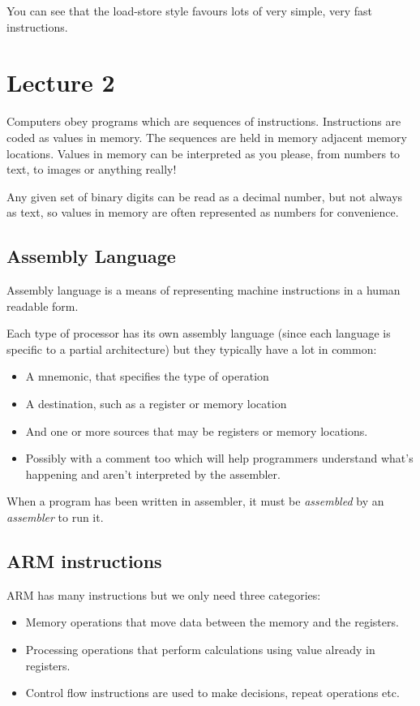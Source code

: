 \documentclass{article}
\begin{document}
You can see that the load-store style favours lots of very simple, very fast instructions.

\section{Lecture 2}
Computers obey programs which are sequences of instructions. Instructions are coded as values in memory. The sequences are held in memory adjacent memory locations. Values in memory can be interpreted as you please, from numbers to text, to images or anything really!

Any given set of binary digits can be read as a decimal number, but not always as text, so values in memory are often represented as numbers for convenience.

\subsection{Assembly Language}
Assembly language is a means of representing machine instructions in a human readable form.

Each type of processor has its own assembly language (since each language is specific to a partial architecture) but they typically have a lot in common:

\begin{itemize}
	\item A mnemonic, that specifies the type of operation
	\item A destination, such as a register or memory location
	\item And one or more sources that may be registers or memory locations.
	\item Possibly with a comment too which will help programmers understand what's happening and aren't interpreted by the assembler.
\end{itemize}

When a program has been written in assembler, it must be {\it assembled} by an {\it assembler} to run it.

\subsection{ARM instructions}

ARM has many instructions but we only need three categories:

\begin{itemize}
	\item Memory operations that move data between the memory and the registers.
	\item Processing operations that perform calculations using value already in registers.
	\item Control flow instructions are used to make decisions, repeat operations etc.
\end{itemize}
\end{document}
